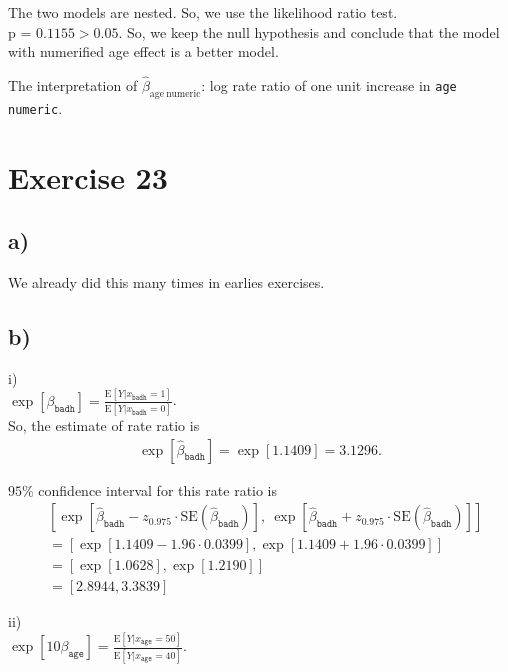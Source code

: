 \documentclass[a4paper]{article}
\newcommand{\E}{\mathrm{E}}
\begin{document}
The two models are nested. So, we use the likelihood ratio test.\\
p = $0.1155 > 0.05$. So, we keep the null hypothesis and conclude that the model with numerified age effect is a better model.

The interpretation of $\widehat{\beta}_{\mathrm{age~numeric}}$: log rate ratio of one unit increase in \texttt{age numeric}.




\vspace{\baselineskip}
\section{Exercise 23}
\subsection{a)}
We already did this many times in earlies exercises.


\vspace{\baselineskip}
\subsection{b)}
i)\\
$\exp\left[\beta_{\mathrm{\texttt{badh}}}\right] = \frac{\E\left[Y|x_{\mathrm{\texttt{badh}}} = 1\right]}{\E\left[Y|x_{\mathrm{\texttt{badh}}} = 0\right]}$.\\

So, the estimate of rate ratio is
\begin{align*}
\exp\left[\widehat{\beta}_{\mathrm{\texttt{badh}}}\right] = \exp\left[1.1409\right] = 3.1296.
\end{align*}

$95\%$ confidence interval for this rate ratio is
\begin{align*}
&\left[\exp\left[\widehat{\beta}_{\mathrm{\texttt{badh}}} - z_{0.975} \cdot \mathrm{SE}(\widehat{\beta}_{\mathrm{\texttt{badh}}})\right],~\exp\left[\widehat{\beta}_{\mathrm{\texttt{badh}}} + z_{0.975} \cdot \mathrm{SE}(\widehat{\beta}_{\mathrm{\texttt{badh}}})\right] \right]\\
&= \left[\exp[1.1409 - 1.96 \cdot 0.0399], \exp[1.1409 + 1.96 \cdot 0.0399]\right]\\
&= \left[\exp[1.0628], \exp[1.2190]\right]\\
&= [2.8944, 3.3839]
\end{align*}

ii)\\
$\exp\left[10\beta_{\mathrm{\texttt{age}}}\right] = \frac{\E\left[Y|x_{\mathrm{\texttt{age}}} = 50\right]}{\E\left[Y|x_{\mathrm{\texttt{age}}} = 40\right]}$.\\
\end{document}
